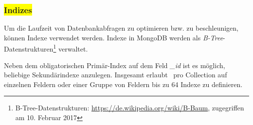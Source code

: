 \subsubsection{\colorbox{yellow}{Indizes}}
Um die Laufzeit von Datenbankabfragen zu optimieren bzw. zu beschleunigen, können Indexe verwendet werden. Indexe in MongoDB werden als \textit{B-Tree}-Datenstrukturen\footnote{B-Tree-Datenstrukturen: \url{https://de.wikipedia.org/wiki/B-Baum}, zugegriffen am 10. Februar 2017} verwaltet.

Neben dem obligatorischen Primär-Index auf dem Feld \textit{\_id} ist es möglich, beliebige Sekundärindexe anzulegen. Insgesamt erlaubt \mongo\, pro Collection auf einzelnen Feldern oder einer Gruppe von Feldern bis zu 64 Indexe zu definieren.

